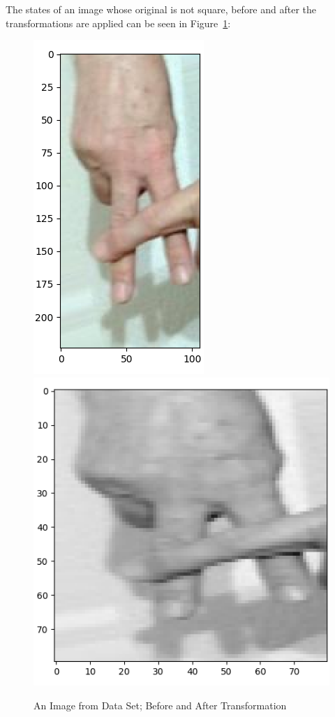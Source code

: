 \documentclass{article}
\begin{document}
\begin{flushleft}
\vspace{2mm}
The states of an image whose original is not square, before and after the transformations are applied can be seen in Figure~\ref{fig:transformed_A}:

\begin{figure}[h]
    \centering
    \includegraphics[scale=0.5]{images/A_original_2.png}
    \includegraphics[scale=0.5]{images/A_transformed_2.png}
    \caption{An Image from Data Set; Before and After Transformation}
    \label{fig:transformed_A}
\end{figure}


\end{flushleft}
\end{document}
